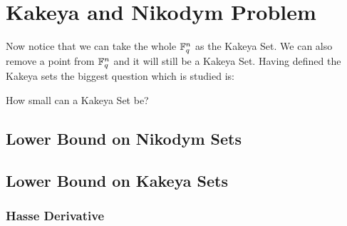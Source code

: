 \section{Kakeya and Nikodym Problem}

Now notice that we can take the whole $\mathbb{F}^n_q$ as the Kakeya Set. We can also remove a point from $\mathbb{F}_q^n$ and it will still be a Kakeya Set.  Having defined the Kakeya sets the biggest question which is studied is:

\begin{question}{}{}
	How small can a Kakeya Set be?
\end{question}
\subsection{Lower Bound on Nikodym Sets}
\subsection{Lower Bound on Kakeya Sets}
\subsubsection{Hasse Derivative}